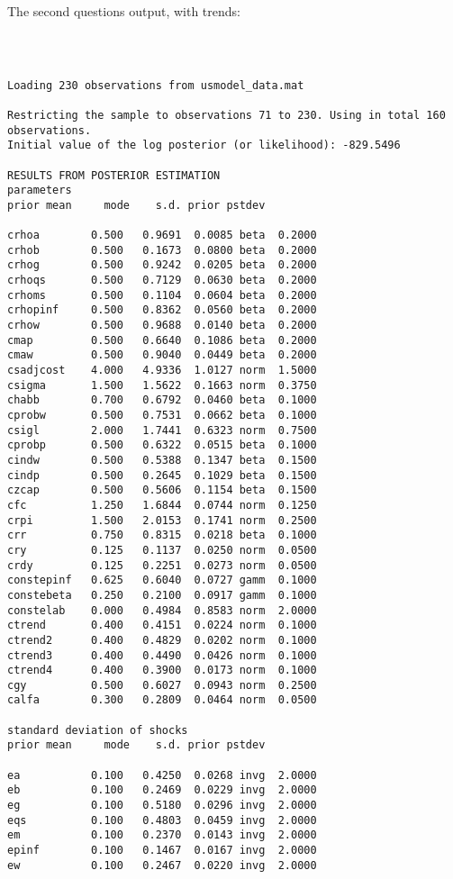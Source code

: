 \documentclass[]{article}
\begin{document}
The second questions output, with trends:
\begin{verbatim}



Loading 230 observations from usmodel_data.mat

Restricting the sample to observations 71 to 230. Using in total 160 observations. 
Initial value of the log posterior (or likelihood): -829.5496

RESULTS FROM POSTERIOR ESTIMATION
parameters
prior mean     mode    s.d. prior pstdev

crhoa        0.500   0.9691  0.0085 beta  0.2000 
crhob        0.500   0.1673  0.0800 beta  0.2000 
crhog        0.500   0.9242  0.0205 beta  0.2000 
crhoqs       0.500   0.7129  0.0630 beta  0.2000 
crhoms       0.500   0.1104  0.0604 beta  0.2000 
crhopinf     0.500   0.8362  0.0560 beta  0.2000 
crhow        0.500   0.9688  0.0140 beta  0.2000 
cmap         0.500   0.6640  0.1086 beta  0.2000 
cmaw         0.500   0.9040  0.0449 beta  0.2000 
csadjcost    4.000   4.9336  1.0127 norm  1.5000 
csigma       1.500   1.5622  0.1663 norm  0.3750 
chabb        0.700   0.6792  0.0460 beta  0.1000 
cprobw       0.500   0.7531  0.0662 beta  0.1000 
csigl        2.000   1.7441  0.6323 norm  0.7500 
cprobp       0.500   0.6322  0.0515 beta  0.1000 
cindw        0.500   0.5388  0.1347 beta  0.1500 
cindp        0.500   0.2645  0.1029 beta  0.1500 
czcap        0.500   0.5606  0.1154 beta  0.1500 
cfc          1.250   1.6844  0.0744 norm  0.1250 
crpi         1.500   2.0153  0.1741 norm  0.2500 
crr          0.750   0.8315  0.0218 beta  0.1000 
cry          0.125   0.1137  0.0250 norm  0.0500 
crdy         0.125   0.2251  0.0273 norm  0.0500 
constepinf   0.625   0.6040  0.0727 gamm  0.1000 
constebeta   0.250   0.2100  0.0917 gamm  0.1000 
constelab    0.000   0.4984  0.8583 norm  2.0000 
ctrend       0.400   0.4151  0.0224 norm  0.1000 
ctrend2      0.400   0.4829  0.0202 norm  0.1000 
ctrend3      0.400   0.4490  0.0426 norm  0.1000 
ctrend4      0.400   0.3900  0.0173 norm  0.1000 
cgy          0.500   0.6027  0.0943 norm  0.2500 
calfa        0.300   0.2809  0.0464 norm  0.0500 

standard deviation of shocks
prior mean     mode    s.d. prior pstdev

ea           0.100   0.4250  0.0268 invg  2.0000 
eb           0.100   0.2469  0.0229 invg  2.0000 
eg           0.100   0.5180  0.0296 invg  2.0000 
eqs          0.100   0.4803  0.0459 invg  2.0000 
em           0.100   0.2370  0.0143 invg  2.0000 
epinf        0.100   0.1467  0.0167 invg  2.0000 
ew           0.100   0.2467  0.0220 invg  2.0000 



\end{verbatim}
\end{document}
